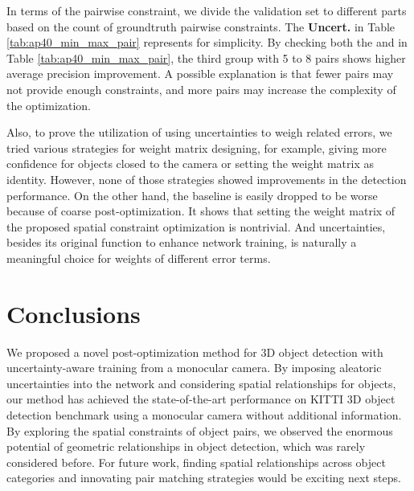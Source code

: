 \documentclass[10pt,twocolumn,letterpaper]{article}
\begin{document}
In terms of the pairwise constraint, we divide the validation set to different parts based on the count of groundtruth pairwise constraints. The \textbf{Uncert.} in Table \ref{tab:ap40_min_max_pair} represents \textbf{} for simplicity. By checking both the  and  in Table \ref{tab:ap40_min_max_pair}, the third group with 5 to 8 pairs shows higher average precision improvement. A possible explanation is that fewer pairs may not provide enough constraints, and more pairs may increase the complexity of the optimization.


Also, to prove the utilization of using uncertainties to weigh related errors, we tried various strategies for weight matrix designing, for example, giving more confidence for objects closed to the camera or setting the weight matrix as identity. However, none of those strategies showed improvements in the detection performance. On the other hand, the baseline is easily dropped to be worse because of coarse post-optimization. It shows that setting the weight matrix of the proposed spatial constraint optimization is nontrivial. And uncertainties, besides its original function to enhance network training, is naturally a meaningful choice for weights of different error terms.








 



\section{Conclusions}


We proposed a novel post-optimization method for 3D object detection with uncertainty-aware training from a monocular camera. By imposing aleatoric uncertainties into the network and considering spatial relationships for objects, our method has achieved the state-of-the-art performance on KITTI 3D object detection benchmark using a monocular camera without additional information.
By exploring the spatial constraints of object pairs, we observed the enormous potential of geometric relationships in object detection, which was rarely considered before. For future work, finding spatial relationships across object categories and innovating pair matching strategies would be exciting next steps.



\clearpage

{\small


}
\end{document}
